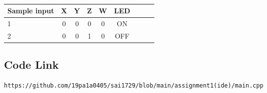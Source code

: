 \documentclass[10pt, a4paper]{article}
\begin{document}
\begin{table}[htbp]
 \begin{center}
    \begin{tabular}{|l|c|c|c|c|c|c|c|c} \hline \textbf{Sample input}
  & \textbf{X} & \textbf{Y} & \textbf{Z}& \textbf{W}& \textbf{LED } \\
 \hline
1&0&0&0&0&ON\\ \hline
2&0&0&1&0&OFF \\ \hline
\end{tabular}   
\end{center}
\caption{\label{table:dummytable} }
\end{table}

\subsection{Code Link}
\vspace{5mm}
\begin{lstlisting}
https://github.com/19pa1a0405/sai1729/blob/main/assignment1(ide)/main.cpp
\end{lstlisting}
\end{document}
